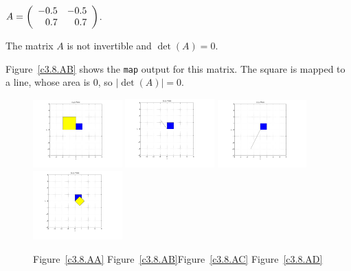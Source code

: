 \documentclass{ximera}
\begin{document}
\begin{computerExercise}  \label{c3.8.AB}
$A=\left(\begin{array}{rr} -0.5 & -0.5\\ 0.7 &0.7\end{array}\right)$.

\begin{solution}
\ans The matrix $A$ is not invertible and $\det(A) = 0$.

\soln Figure~\ref{c3.8.AB} shows the {\tt map} output for this matrix.
The square is mapped to a line, whose area is $0$, so $|\det(A)| = 0$.

\begin{figure}[htb]
                       \centerline{%
                       \includegraphics[width=1.35in]{exfigure/3-8-AA.pdf}
                       \includegraphics[width=1.35in]{exfigure/3-8-AB.pdf}
                       \includegraphics[width=1.35in]{exfigure/3-8-AC.pdf}
                       \includegraphics[width=1.35in]{exfigure/3-8-AD.pdf}}
        \centerline{Figure~\ref{c3.8.AA}\hspace{0.8in}
        Figure~\ref{c3.8.AB}\hspace{0.8in}Figure~\ref{c3.8.AC}
        \hspace{0.8in}Figure~\ref{c3.8.AD}}

    \end{figure}
\end{solution}    
\end{computerExercise}
\end{document}
